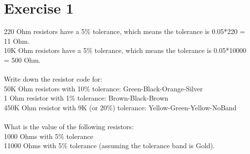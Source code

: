 \part*{Exercise 1}
220 Ohm resistors have a 5\% tolerance, which means the tolerance is 0.05*220 = 11 Ohm.\\
10K Ohm resistors have a 5\% tolerance, which means the tolerance is 0.05*10000 = 500 Ohm.\\\\
Write down the resistor code for:\\
50K Ohm resistors with 10\% tolerance: Green-Black-Orange-Silver\\
1 Ohm resistor with 1\% tolerance: Brown-Black-Brown\\
450K Ohm resistor with 9K (or 20\%) tolerance: Yellow-Green-Yellow-NoBand\\\\
What is the value of the following resistors: \\
1000 Ohms with 5\% tolerance\\
11000 Ohms with 5\% tolerance (assuming the tolerance band is Gold).
